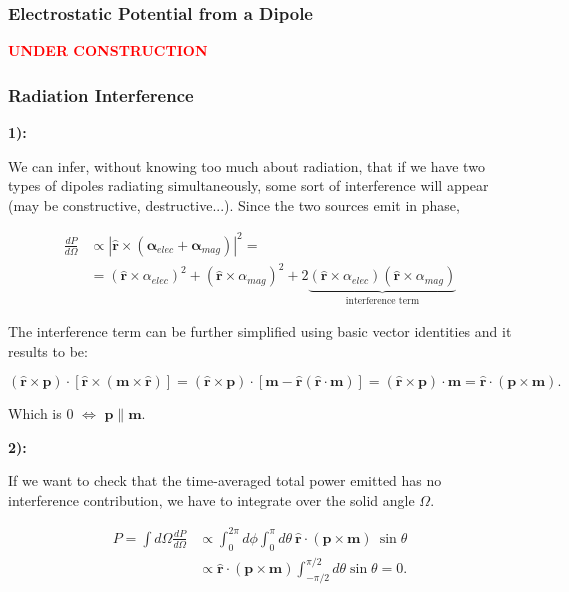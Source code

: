 \subsubsection{Electrostatic Potential from a Dipole}\label{Electrostatic Potential from a Dipole}

\textbf{\textcolor{red}{UNDER CONSTRUCTION}}

\subsubsection{Radiation Interference}\label{Radiation Interference}

\textbf{1):}

We can infer, without knowing too much about radiation, that if we have two types of dipoles radiating simultaneously, some sort of interference will appear (may be constructive, destructive...). Since the two sources emit in phase,

\begin{equation}
	\begin{split}
		\frac{d P}{d \Omega} &\propto |\hat{\mathbf{r}} \times (\mathbf{\alpha}_{elec}+\mathbf{\alpha}_{mag})|^{2} =\\
		&= (\hat{\mathbf{r}}\times\alpha_{elec})^{2} + (\hat{\mathbf{r}}\times\alpha_{mag})^{2} + 2\underbrace{(\hat{\mathbf{r}}\times\alpha_{elec})(\hat{\mathbf{r}}\times\alpha_{mag})}_{\text{interference term}}
	\end{split}
\end{equation}

The interference term can be further simplified using basic vector identities and it results to be:

\begin{equation}
	(\hat{\mathbf{r}} \times \mathbf{p}) \cdot[\hat{\mathbf{r}} \times(\mathbf{m} \times \hat{\mathbf{r}})]=(\hat{\mathbf{r}} \times \mathbf{p}) \cdot[\mathbf{m}-\hat{\mathbf{r}}(\hat{\mathbf{r}} \cdot \mathbf{m})]=(\hat{\mathbf{r}} \times \mathbf{p}) \cdot \mathbf{m}=\hat{\mathbf{r}} \cdot(\mathbf{p} \times \mathbf{m}).
\end{equation}

Which is 0 $\iff$ $\mathbf{p} \parallel \mathbf{m}$.

\textbf{2):}

If we want to check that the time-averaged total power emitted has no interference contribution, we have to integrate over the solid angle $\Omega$.

\begin{equation}
	\begin{split}
		P=\int d \Omega \frac{d P}{d \Omega} &\propto \int_{0}^{2 \pi} d \phi \int_{0}^{\pi} d \theta \: \hat{\mathbf{r}} \cdot(\mathbf{p} \times \mathbf{m})\: \sin \theta  \\
		&\propto \hat{\mathbf{r}}\cdot(\mathbf{p} \times \mathbf{m}) \int_{-\pi/2}^{\pi/2} d\theta \sin \theta=0.
	\end{split}
\end{equation}


